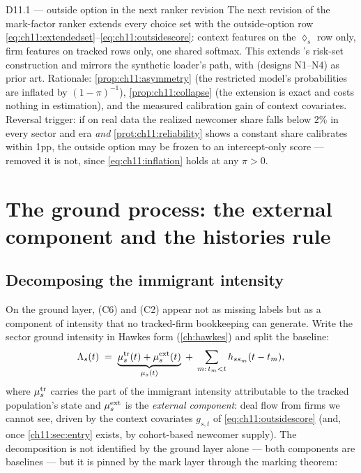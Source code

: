 \begin{decision}{D11.1 --- outside option in the next ranker revision}
The next revision of the mark-factor ranker extends every choice set with
the outside-option row \cref{eq:ch11:extendedset}--\cref{eq:ch11:outsidescore}:
context features on the $\lozenge_s$ row only, firm features on tracked
rows only, one shared softmax. This extends
's risk-set construction and mirrors the
synthetic loader's 
path, with  (designs
N1--N4) as prior art. Rationale: \cref{prop:ch11:asymmetry} (the
restricted model's probabilities are inflated by $(1-\pi)^{-1}$),
\cref{prop:ch11:collapse} (the extension is exact and costs nothing in
estimation), and the measured calibration gain of context covariates.
Reversal trigger: if on real data the realized newcomer share falls below
$2\%$ in every sector and era \emph{and}
\cref{prot:ch11:reliability} shows a constant share calibrates within
1pp, the outside option may be frozen to an intercept-only score ---
removed it is not, since \cref{eq:ch11:inflation} holds at any $\pi>0$.
\end{decision}

\section{The ground process: the external component and the histories rule}\label{ch11:sec:ground}

\subsection{Decomposing the immigrant intensity}\label{ch11:sec:mudecomp}

On the ground layer, (C6) and (C2) appear not as missing labels but as a
component of intensity that no tracked-firm bookkeeping can generate.
Write the sector ground intensity in Hawkes form
(\cref{ch:hawkes}) and split the baseline:
\begin{equation}\label{eq:ch11:mudecomp}
\Lambda_s(t)
 \;=\;
 \underbrace{\mu_s^{\mathrm{tr}}(t) + \mu_s^{\mathrm{ext}}(t)}_{\mu_s(t)}
 \;+\; \sum_{m:\, t_m < t} h_{s s_m}(t - t_m),
\end{equation}
where $\mu_s^{\mathrm{tr}}$ carries the part of the immigrant intensity
attributable to the tracked population's state and
$\mu_s^{\mathrm{ext}}$ is the \emph{external component}: deal flow from
firms we cannot see, driven by the context covariates $g_{s,t}$ of
\cref{eq:ch11:outsidescore} (and, once \cref{ch11:sec:entry} exists, by
cohort-based newcomer supply). The decomposition is not identified by the
ground layer alone --- both components are baselines --- but it is pinned
by the mark layer through the marking theorem:

